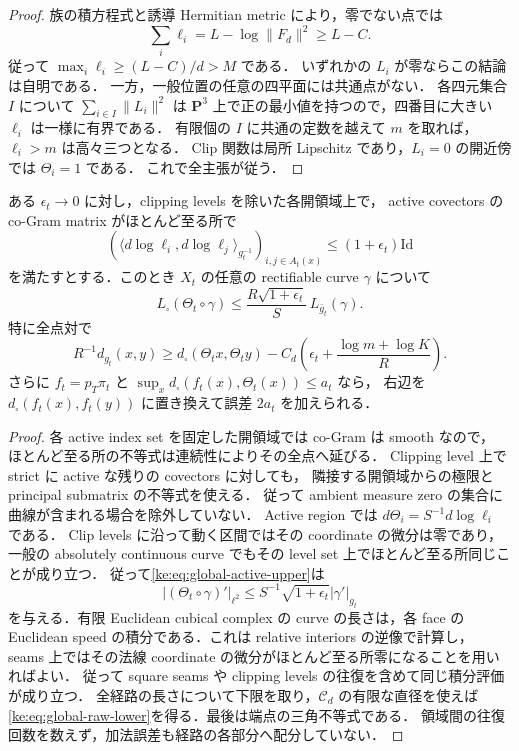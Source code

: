 \begin{proof}
族の積方程式と誘導 Hermitian metric により，零でない点では
\[
 \sum_i\ell_i=L-\log\|F_d\|^2\ge L-C.
\]
従って $\max_i\ell_i\ge(L-C)/d>M$ である．
いずれかの $L_i$ が零ならこの結論は自明である．
一方，一般位置の任意の四平面には共通点がない．
各四元集合 $I$ について $\sum_{i\in I}\|L_i\|^2$ は
$\mathbf P^3$ 上で正の最小値を持つので，四番目に大きい $\ell_i$ は一様に有界である．
有限個の $I$ に共通の定数を越えて $m$ を取れば，$\ell_i>m$ は高々三つとなる．
Clip 関数は局所 Lipschitz であり，$L_i=0$ の開近傍では $\Theta_i=1$ である．
これで全主張が従う．
\end{proof}

\begin{lemma}
\label{ke:global-clipped-cogram-lower}
ある $\epsilon_t\to0$ に対し，clipping levels を除いた各開領域上で，
active covectors の co-Gram matrix がほとんど至る所で
\begin{equation}\label{ke:eq:global-active-upper}
 \left(\langle d\log\ell_i,d\log\ell_j\rangle_{g_t^{-1}}
       \right)_{i,j\in A_t(x)}\le(1+\epsilon_t)\mathrm{Id}
\end{equation}
を満たすとする．このとき $X_t$ の任意の rectifiable curve $\gamma$ について
\[
 L_\square(\Theta_t\circ\gamma)
 \le\frac{R\sqrt{1+\epsilon_t}}S\,L_{\bar g_t}(\gamma).
\]
特に全点対で
\begin{equation}\label{ke:eq:global-raw-lower}
 R^{-1}d_{g_t}(x,y)
 \ge d_\square(\Theta_t x,\Theta_t y)
 -C_d\left(\epsilon_t+\frac{\log m+\log K}{R}\right).
\end{equation}
さらに $f_t=p_T\pi_t$ と
$\sup_xd_\square(f_t(x),\Theta_t(x))\le a_t$ なら，
右辺を $d_\square(f_t(x),f_t(y))$ に置き換えて誤差 $2a_t$ を加えられる．
\end{lemma}

\begin{proof}
各 active index set を固定した開領域では co-Gram は smooth なので，
ほとんど至る所の不等式は連続性によりその全点へ延びる．
Clipping level 上で strict に active な残りの covectors に対しても，
隣接する開領域からの極限と principal submatrix の不等式を使える．
従って ambient measure zero の集合に曲線が含まれる場合を除外していない．
Active region では $d\Theta_i=S^{-1}d\log\ell_i$ である．
Clip levels に沿って動く区間ではその coordinate の微分は零であり，
一般の absolutely continuous curve でもその level set 上でほとんど至る所同じことが成り立つ．
従って\eqref{ke:eq:global-active-upper}は
\[
 |(\Theta_t\circ\gamma)'|_{\ell^2}
 \le S^{-1}\sqrt{1+\epsilon_t}|\gamma'|_{g_t}
\]
を与える．有限 Euclidean cubical complex の curve の長さは，各 face の
Euclidean speed の積分である．これは relative interiors の逆像で計算し，
seams 上ではその法線 coordinate の微分がほとんど至る所零になることを用いればよい．
従って square seams や clipping levels の往復を含めて同じ積分評価が成り立つ．
全経路の長さについて下限を取り，$\mathcal C_d$ の有限な直径を使えば
\eqref{ke:eq:global-raw-lower}を得る．最後は端点の三角不等式である．
領域間の往復回数を数えず，加法誤差も経路の各部分へ配分していない．
\end{proof}

